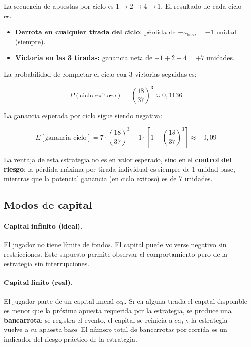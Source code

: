 \documentclass[a4paper, 11pt]{article}
\begin{document}
La secuencia de apuestas por ciclo es $1 \to 2 \to 4 \to 1$. El resultado
de cada ciclo es:

\begin{itemize}
  \item \textbf{Derrota en cualquier tirada del ciclo:} pérdida de
        $-a_{\text{base}} = -1$ unidad (siempre).
  \item \textbf{Victoria en las 3 tiradas:} ganancia neta de
        $+1 + 2 + 4 = +7$ unidades.
\end{itemize}

La probabilidad de completar el ciclo con 3 victorias seguidas es:

\begin{equation}
  P(\text{ciclo exitoso}) = \left(\frac{18}{37}\right)^3 \approx 0{,}1136
  \label{eq:paroli_prob}
\end{equation}

La ganancia esperada por ciclo sigue siendo negativa:

\begin{equation}
  E[\text{ganancia ciclo}] = 7 \cdot \left(\frac{18}{37}\right)^3
    - 1 \cdot \left[1 - \left(\frac{18}{37}\right)^3\right] \approx -0{,}09
  \label{eq:paroli_ev}
\end{equation}

La ventaja de esta estrategia no es en valor esperado, sino en el
\textbf{control del riesgo}: la pérdida máxima por tirada individual
es siempre de 1 unidad base, mientras que la potencial ganancia
(en ciclo exitoso) es de 7 unidades.

\subsection{Modos de capital}

\paragraph{Capital infinito (ideal).}
El jugador no tiene límite de fondos. El capital puede volverse negativo
sin restricciones. Este supuesto permite observar el comportamiento puro
de la estrategia sin interrupciones.

\paragraph{Capital finito (real).}
El jugador parte de un capital inicial $cc_0$. Si en alguna tirada el
capital disponible es menor que la próxima apuesta requerida por la
estrategia, se produce una \textbf{bancarrota}: se registra el evento,
el capital se reinicia a $cc_0$ y la estrategia vuelve a su apuesta base.
El número total de bancarrotas por corrida es un indicador del riesgo
práctico de la estrategia.
\end{document}
